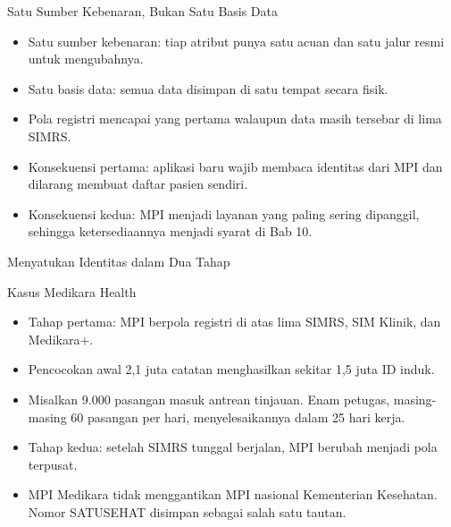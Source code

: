 \documentclass[aspectratio=169, table, 12pt]{beamer}
\begin{document}
\begin{frame}{{\Large Satu Sumber Kebenaran, Bukan Satu Basis Data}}
  \small
  \vspace{6pt}
  \begin{itemize}
    \item Satu sumber kebenaran: tiap atribut punya satu acuan dan satu jalur resmi untuk mengubahnya.
    \item Satu basis data: semua data disimpan di satu tempat secara fisik.
    \item Pola registri mencapai yang pertama walaupun data masih tersebar di lima SIMRS.
    \item Konsekuensi pertama: aplikasi baru wajib membaca identitas dari MPI dan dilarang membuat
          daftar pasien sendiri.
    \item Konsekuensi kedua: MPI menjadi layanan yang paling sering dipanggil, sehingga
          ketersediaannya menjadi syarat di Bab 10.
  \end{itemize}
\end{frame}

\begin{frame}{{\Large Menyatukan Identitas dalam Dua Tahap}}
  \begin{block}{Kasus Medikara Health}
    \small
    \begin{itemize}
      \item Tahap pertama: MPI berpola registri di atas lima SIMRS, SIM Klinik, dan Medikara+.
      \item Pencocokan awal 2,1 juta catatan menghasilkan sekitar 1,5 juta ID induk.
      \item Misalkan 9.000 pasangan masuk antrean tinjauan. Enam petugas, masing-masing 60 pasangan
            per hari, menyelesaikannya dalam 25 hari kerja.
      \item Tahap kedua: setelah SIMRS tunggal berjalan, MPI berubah menjadi pola terpusat.
      \item MPI Medikara tidak menggantikan MPI nasional Kementerian Kesehatan. Nomor SATUSEHAT
            disimpan sebagai salah satu tautan.
    \end{itemize}
  \end{block}
\end{frame}
\end{document}
